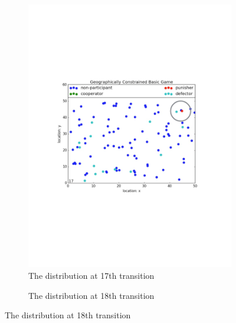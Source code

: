 \documentclass[11pt]{article}
\begin{document}
\begin{figure}[!h]
 \caption{The distribution of agents in geographically constrained game}
 \begin{subfigure}{.5\textwidth}
   \caption{The distribution at 17th transition}
   \includegraphics[scale = 0.4]{8.pdf}
 \end{subfigure}
 \begin{subfigure}{.5\textwidth}
   \label{}
   \centering
   \caption{The distribution at 18th transition}

\end{subfigure}
\end{figure}
\end{document}
